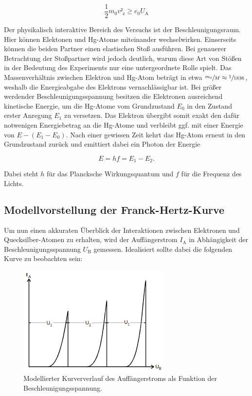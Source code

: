 \begin{equation*}
    \frac{1}{2}m_0v²_\text{z} \geq e_0U_\text{A}
\end{equation*}

\noindent Der physikalisch interaktive Bereich des Versuchs ist der Beschleunigungsraum. Hier können Elektonen und Hg-Atome miteinander wechselwirken.
Einserseits können die beiden Partner einen elastischen Stoß ausführen. Bei genauerer Betrachtung der Stoßpartner wird jedoch deutlich, warum diese Art von 
Stößen in der Bedeutung des Experiments nur eine untergeordnete Rolle spielt. Das Massenverhältnis zwischen Elektron und Hg-Atom beträgt in etwa 
$\sfrac{m_0}{M} \approx \sfrac{1}{1836}$, weshalb die Energieabgabe des Elektrons vernachlässigbar ist. Bei größer werdender Beschleunigungsspannung besitzen 
die Elektronen ausreichend kinetische Energie, um die Hg-Atome vom Grundzustand $E_0$ in den Zustand erster Anregung $E_1$ zu versetzen. Das Elektron übergibt 
somit exakt den dafür notwenigen Energiebetrag an die Hg-Atome und verbleibt ggf. mit einer Energie von $E - \left(E_1 - E_0\right)$. Nach einer gewissen
Zeit kehrt das Hg-Atom erneut in den Grundzustand zurück und emittiert dabei ein Photon der Energie 

\begin{equation*}
    E = hf = E_1 - E_2. 
\end{equation*}

\noindent Dabei steht $h$ für das Plancksche Wirkungsquantum und $f$ für die Frequenz des Lichts.\\

\subsection{Modellvorstellung der Franck-Hertz-Kurve}
\label{sec:Modellvorstellung}

\noindent Um nun einen akkuraten Überblick der Interaktionen zwischen Elektronen und Quecksilber-Atomen zu erhalten, wird der Auffängerstrom $I_\text{A}$
in Abhängigkeit der Beschleunigungsspannung $U_\text{B}$ gemessen. Idealisiert sollte dabei die folgenden Kurve zu beobachten sein:

\begin{figure}
    \centering
    \includegraphics[height=5.5cm]{FH_Modellkurve.png}
    \caption{Modellierter Kurververlauf des Auffängerstroms als Funktion der Beschleunigungsspannung\cite{Versuchsanleitung_v601}.}
    \label{fig:FH_Modellkurve}
\end{figure}

